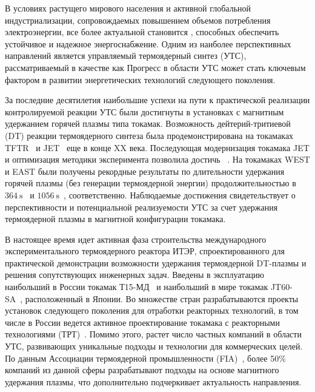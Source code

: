 
{\actuality} В условиях растущего мирового населения и активной глобальной индустриализации, сопровождаемых повышением объемов потребления электроэнергии,
все более актуальной становится , способных обеспечить устойчивое и надежное энергоснабжение.  Одним из наиболее перспективных направлений является управляемый термоядерный синтез (УТС), рассматриваемый в качестве как  Прогресс в области УТС может стать ключевым фактором в развитии энергетических технологий следующего поколения.

За последние десятилетия наибольшие успехи на пути к практической реализации контролируемой реакции УТС были достигнуты в установках с магнитным удержанием горячей плазмы типа токамак. Возможность  дейтерий-тритиевой (DT) реакции термоядерного синтеза была продемонстрирована на токамаках TFTR~\cite{Skinner1997} и JET~\cite{Keilhacker1999} еще в конце XX века. Последующая модернизация токамака JET и оптимизация методики эксперимента позволила достичь ~\cite{Maggi2024,Kappatou2025}. На токамаках WEST и EAST были получены рекордные результаты по длительности удержания горячей плазмы (без генерации термоядерной энергии) продолжительностью в \(\SI{364}{\second}\)~\cite{Shi2025} и \(\SI{1056}{\second}\)~\cite{Gong2024}, соответственно. Наблюдаемые достижения свидетельствует о перспективности и потенциальной реализуемости УТС за счет удержания термоядерной плазмы в магнитной конфигурации токамака.

В настоящее время идет активная фаза строительства международного экспериментального термоядерного реактора ИТЭР, спроектированного для практической демонстрации возможности  удержания термоядерной DT-плазмы и решения сопутствующих инженерных задач. Введены в эксплуатацию наибольший в России токамак Т15-МД~\cite{Velikhov2024} и наибольший в мире токамак JT60-SA~\cite{Shirai2024}, расположенный в Японии. Во множестве стран разрабатываются проекты установок следующего поколения для отработки реакторных технологий, в том числе в России ведется активное проектирование токамака с реакторными технологиями (ТРТ)~\cite{Krasilnikov2021}. Помимо этого, растет число частных компаний в области УТС, развивающих уникальные подходы и технологии для коммерческих целей. По данным Ассоциации термоядерной промышленности (FIA)~\cite{FIA}, более 50\% компаний из данной сферы разрабатывают подходы на основе магнитного удержания плазмы, что дополнительно подчеркивает актуальность направления.

